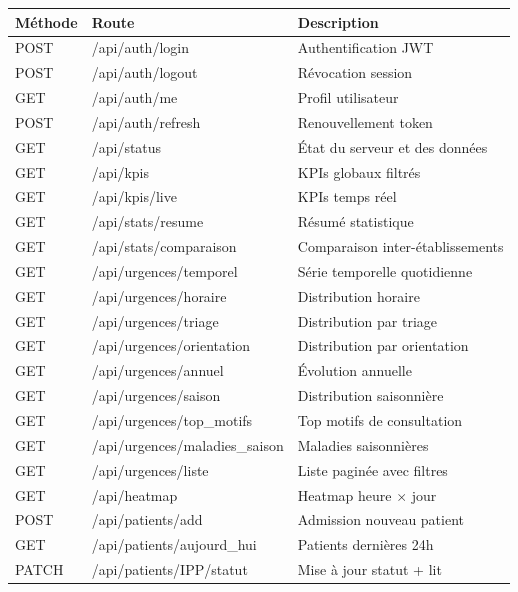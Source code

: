 \documentclass[12pt,a4paper]{report}
\begin{document}
	\begin{longtable}{llp{6cm}}
		\toprule
		\textbf{Méthode} & \textbf{Route} & \textbf{Description} \\
		\midrule
		\endhead
		POST   & /api/auth/login               & Authentification JWT \\
		POST   & /api/auth/logout              & Révocation session \\
		GET    & /api/auth/me                  & Profil utilisateur \\
		POST   & /api/auth/refresh             & Renouvellement token \\
		GET    & /api/status                   & État du serveur et des données \\
		GET    & /api/kpis                     & KPIs globaux filtrés \\
		GET    & /api/kpis/live                & KPIs temps réel \\
		GET    & /api/stats/resume             & Résumé statistique \\
		GET    & /api/stats/comparaison        & Comparaison inter-établissements \\
		GET    & /api/urgences/temporel        & Série temporelle quotidienne \\
		GET    & /api/urgences/horaire         & Distribution horaire \\
		GET    & /api/urgences/triage          & Distribution par triage \\
		GET    & /api/urgences/orientation     & Distribution par orientation \\
		GET    & /api/urgences/annuel          & Évolution annuelle \\
		GET    & /api/urgences/saison          & Distribution saisonnière \\
		GET    & /api/urgences/top\_motifs     & Top motifs de consultation \\
		GET    & /api/urgences/maladies\_saison & Maladies saisonnières \\
		GET    & /api/urgences/liste           & Liste paginée avec filtres \\
		GET    & /api/heatmap                  & Heatmap heure $\times$ jour \\
		POST   & /api/patients/add             & Admission nouveau patient \\
		GET    & /api/patients/aujourd\_hui    & Patients dernières 24h \\
		PATCH  & /api/patients/{IPP}/statut    & Mise à jour statut + lit \\

\end{longtable}
\end{document}
